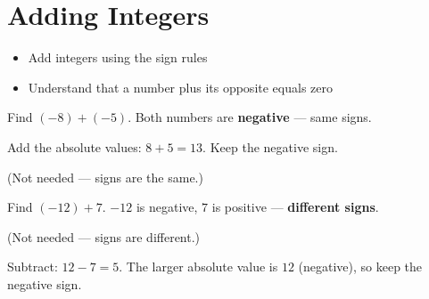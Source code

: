 \section{Adding Integers}

\begin{stepGoal}
\begin{itemize}
    \item Add integers using the sign rules
    \item Understand that a number plus its opposite equals zero
\end{itemize}
\end{stepGoal}

\begin{stepVocabBox}
\end{stepVocabBox}

\begin{stepsCard}
\end{stepsCard}

\begin{stepExample}{Find $(-8) + (-5)$.}
     Both numbers are \textbf{negative} — same signs.

     Add the absolute values: $8 + 5 = 13$. Keep the negative sign.

     (Not needed — signs are the same.)
\end{stepExample}

\begin{stepExample}{Find $(-12) + 7$.}
     $-12$ is negative, $7$ is positive — \textbf{different signs}.

     (Not needed — signs are different.)

     Subtract: $12 - 7 = 5$. The larger absolute value is $12$ (negative), so keep the negative sign.
\end{stepExample}

